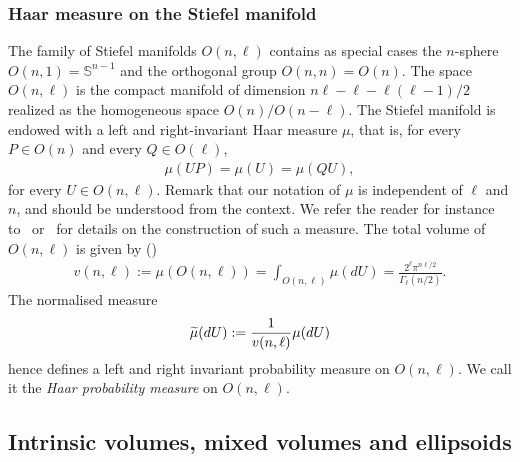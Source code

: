 \documentclass[10pt]{amsart}
\theoremstyle{definition}\newtheorem{defi}[theo]{Definition}\newtheorem{rema}[theo]{Remark}\newtheorem{exam}[theo]{Example}\newtheorem{exem}[theo]{Example}\newtheorem{nota}[theo]{Notation}
\newcommand{\bbS}{\mathbb{S}}
\let\oldtilde\tilde
\renewcommand*{\tilde}[1]{\mathchoice{\widetilde{#1}}{\widetilde{#1}}{\oldtilde{#1}}{\oldtilde{#1}}}
\begin{document}
\subsubsection*{Haar measure on the Stiefel manifold}
The family of Stiefel manifolds $O(n,\ell)$ contains as special cases the $n$-sphere $O(n,1) = \bbS^{n-1}$ and the orthogonal group $O(n,n) = O(n)$. The space $O(n,\ell)$ is the compact manifold of dimension $n\ell -
\ell - \ell(\ell-1)/2$ realized as the homogeneous space $O(n)/O(n-\ell)$. The Stiefel manifold is endowed with a left and right-invariant Haar measure $\mu$, that is, for every $P \in O(n)$ and every $Q \in O(\ell)$,
\begin{gather*}
\mu(UP) = \mu(U) = \mu(QU),
\end{gather*}
for every $U \in O(n,\ell)$. Remark that our notation of $\mu$ is independent of $\ell$ and $n$, and should be understood from the context. We refer the reader for instance to~\cite{Ch2012} or~\cite{Muir} for details on the construction of such a measure. The total volume of $O(n,\ell)$ is given by (\cite[Eq.~(1.4.8)]{Ch2012})
\begin{gather*}
v(n,\ell) := \mu(O(n,\ell)) = \int_{O(n,\ell)} \mu(dU) = \frac{2^{\ell}\pi^{n\ell/2}}{\Gamma_{\ell}(n/2)}.
\end{gather*}
The normalised measure
\begin{equation}
\tilde{\mu}(dU) := \frac{1}{v(n,\ell)} \mu(dU)
\end{equation}
hence defines a left and right invariant probability measure on $O(n,\ell)$. We call it the \emph{Haar probability measure} on $O(n,\ell)$.



\subsection{Intrinsic volumes, mixed volumes and ellipsoids}\label{SecGeom}
\end{document}

